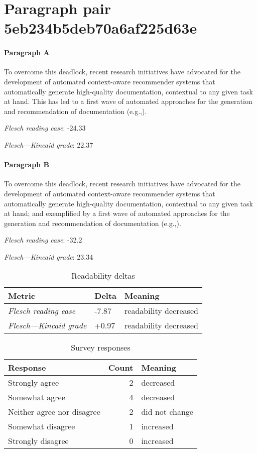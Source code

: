 \section{Paragraph pair 5eb234b5deb70a6af225d63e}
\paragraph{Paragraph A}
To overcome this deadlock, recent research initiatives have advocated for the development of automated context-aware recommender systems that automatically generate high-quality documentation, contextual to any given task at hand. This has led to a first wave of automated approaches for the generation and recommendation of documentation (e.g.,).\par\medskip
\emph{Flesch reading ease}: -24.33\par
\emph{Flesch---Kincaid grade}: 22.37

\paragraph{Paragraph B}
To overcome this deadlock, recent research initiatives have advocated for the development of automated context-aware recommender systems that automatically generate high-quality documentation, contextual to any given task at hand; and exemplified by a first wave of automated approaches for the generation and recommendation of documentation (e.g.,).\par\medskip
\emph{Flesch reading ease}: -32.2\par
\emph{Flesch---Kincaid grade}: 23.34

\bigskip\begin{table}[!h]
\centering
\begin{tabular}{lll}
\toprule
               \textbf{Metric} & \textbf{Delta} &       \textbf{Meaning} \\
\midrule
    \emph{Flesch reading ease} &          -7.87 &  readability decreased \\
 \emph{Flesch---Kincaid grade} &          +0.97 &  readability decreased \\
\bottomrule
\end{tabular}
\caption*{Readability deltas}\end{table}

\begin{table}[!h]
\centering
\begin{tabular}{lrl}
\toprule
          \textbf{Response} &  \textbf{Count} & \textbf{Meaning} \\
\midrule
             Strongly agree &               2 &        decreased \\
             Somewhat agree &               4 &        decreased \\
 Neither agree nor disagree &               2 &   did not change \\
          Somewhat disagree &               1 &        increased \\
          Strongly disagree &               0 &        increased \\
\bottomrule
\end{tabular}
\caption*{Survey responses}\end{table}


